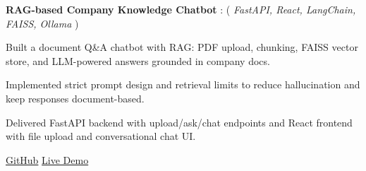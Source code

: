 
\textbf{RAG-based Company Knowledge Chatbot} : ( \textit{FastAPI, React, LangChain, FAISS, Ollama} )
\vspace{0.05cm}
\begin{highlights}
    \item Built a document Q\&A chatbot with RAG: PDF upload, chunking, FAISS vector store, and LLM-powered answers grounded in company docs.
    \item Implemented strict prompt design and retrieval limits to reduce hallucination and keep responses document-based.
    \item Delivered FastAPI backend with upload/ask/chat endpoints and React frontend with file upload and conversational chat UI.
\end{highlights}
\textbf{\faGithub} \href{GITHUB_URL}{GitHub} \quad 
\textbf{\faGlobe} \href{LIVE_URL}{Live Demo}

\vspace{0.2cm}

